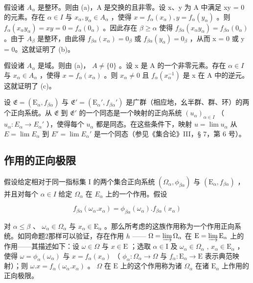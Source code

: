 假设诸 \(A_{\alpha}\) 是整环。则由 (a)，A 是交换的且非零。设 x、y 为 A 中满足 xy = 0 的元素。存在 \(\alpha \in I\) 与 \(x_{\alpha}, y_{\alpha} \in A_{\alpha}\) ，使得 \(x = f_{\alpha}(x_{\alpha}), y = f_{\alpha}(y_{\alpha})\) 。则 \(f_{\alpha}(x_{\alpha}y_{\alpha}) = xy = 0 = f_{\alpha}(0_{\alpha})\) 。因此存在 \(\beta \geqslant \alpha\) 使得 \(f_{\beta\alpha}(x_{\alpha}y_{\alpha}) = f_{\beta\alpha}(0_{\alpha})\) 。由于 \(A_{\beta}\) 是整环，由此得 \(f_{\beta\alpha}(x_{\alpha}) = 0_{\beta}\) 或 \(f_{\beta\alpha}(y_{\alpha}) = 0_{\beta}\) ，从而 x = 0 或 y = 0。这就证明了 (b)。

假设诸 \(A_{\alpha}\) 是域。则由 (a)， \(A \neq \{0\}\) 。设 x 是 A 的一个非零元素。存在 \(\alpha \in I\) 与 \(x_{\alpha} \in A_{\alpha}\) ，使得 \(x = f_{\alpha}(x_{\alpha})\) 。则 \(x_{\alpha} \neq 0\) 且 \(f_{\alpha}(x_{\alpha}^{-1})\) 是 x 在 A 中的逆元。这就证明了 (c)。

设 \(\mathfrak{E} = (\mathrm{E}_{\alpha}, f_{\beta \alpha})\) 与 \(\mathfrak{E}' = (\mathrm{E}_{\alpha}', f_{\beta \alpha}')\) 是广群（相应地，幺半群、群、环）的两个正向系统。从 \(\mathfrak{E}\) 到 \(\mathfrak{E}'\) 的一个同态是一个映射的正向系统 \((u_{\alpha})_{\alpha \in I}\) （ \(u_{\alpha} \colon E_{\alpha} \to E_{\alpha}'\) ），使得每个 \(u_{\alpha}\) 都是同态。在这些条件下，映射 \(u = \lim u_{\alpha}\) 从 \(E = \lim E_{\alpha}\) 到 \(E' = \lim E_{\alpha}'\) 是一个同态（参见《集合论》III，§ 7，第 6 号）。

\subsection{作用的正向极限}

假设给定相对于同一指标集 I 的两个集合正向系统 \((\Omega_{\alpha}, \phi_{\beta\alpha})\) 与 \((\mathrm{E}_{\alpha}, f_{\beta\alpha})\) ，并且对每个 \(\alpha \in I\) 给定 \(\Omega_{\alpha}\) 在 \(E_{\alpha}\) 上的一个作用。假设

\[
f _ {\beta \alpha} (\omega_ {\alpha}. x _ {\alpha}) = \phi_ {\beta \alpha} (\omega_ {\alpha}). f _ {\beta \alpha} (x _ {\alpha})
\]

对 \(\alpha \leqslant \beta\) 、 \(\omega_{\alpha} \in \Omega_{\alpha}\) 与 \(x_{\alpha} \in \mathrm{E}_{\alpha}\) 。那么所考虑的这族作用称为一个作用正向系统。如同命题2那样可以验证，存在作用 \(h\) —— \(\Omega = \varinjlim \Omega_{\alpha}\) 在 \(\mathrm{E} = \varinjlim \mathrm{E}_{\alpha}\) 上的作用——其描述如下：设 \(\omega \in \Omega\) 与 \(x \in \mathrm{E}\) ；选取 \(\alpha \in \mathrm{I}\) 及 \(\omega_{\alpha} \in \Omega_{\alpha}\) , \(x_{\alpha} \in \mathrm{E}_{\alpha}\) ，使得 \(\omega = \phi_{\alpha}(\omega_{\alpha})\) 与 \(x = f_{\alpha}(x_{\alpha})\) （ \(\phi_{\alpha}: \Omega_{\alpha} \to \Omega\) 与 \(f_{\alpha}: \mathrm{E}_{\alpha} \to \mathrm{E}\) 表示典范映射）；则 \(\omega . x = f_{\alpha}(\omega_{\alpha}. x_{\alpha})\) 。 \(\Omega\) 在 \(\mathrm{E}\) 上的这个作用称为诸 \(\Omega_{\alpha}\) 在诸 \(\mathrm{E}_{\alpha}\) 上作用的正向极限。

